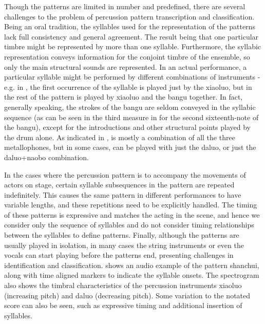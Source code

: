 Though the patterns are limited in number and predefined, there are several challenges to the problem of percussion pattern transcription and classification. Being an oral tradition, the syllables used for the representation of the patterns lack full consistency and general agreement. The result being that one particular timbre might be represented by more than one syllable. Furthermore, the syllabic representation conveys information for the conjoint timbre of the ensemble, so only the main structural sounds are represented. In an actual performance, a particular syllable might be performed by different combinations of instruments - e.g. in , the first occurrence of the syllable  is played just by the \gls{xiaoluo}, but in the rest of the pattern is played by \gls{xiaoluo} and the \gls{bangu} together. In fact, generally speaking, the strokes of the \gls{bangu} are seldom conveyed in the syllabic sequence (as can be seen in the third measure in  for the second sixteenth-note of the \gls{bangu}), except for the introductions and other structural points played by the drum alone. As indicated in ,  is mostly a combination of all the three metallophones, but in some cases,  can be played with just the \gls{daluo}, or just the \gls{daluo}+\gls{naobo} combination. 

In the cases where the percussion pattern is to accompany the movements of actors on stage, certain syllable subsequences in the pattern are repeated indefinitely. This causes the same pattern in different performances to have variable lengths, and these repetitions need to be explicitly handled. The timing of these patterns is expressive and matches the acting in the scene, and hence we consider only the sequence of syllables and do not consider timing relationships between the syllables to define patterns. Finally, although the patterns are usually played in isolation, in many cases the string instruments or even the vocals can start playing before the patterns end, presenting challenges in identification and classification.  shows an audio example of the pattern \gls{shanchui}, along with time aligned markers to indicate the syllable onsets. The spectrogram also shows the timbral characteristics of the percussion instruments \gls{xiaoluo} (increasing pitch) and \gls{daluo} (decreasing pitch). Some variation to the notated score can also be seen, such as expressive timing and additional insertion of syllables.

